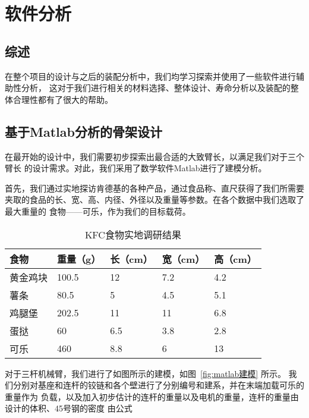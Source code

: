 

\chapter{软件分析}

\section{综述}

  {\songti 在整个项目的设计与之后的装配分析中，我们均学习探索并使用了一些软件进行辅助性分析，
 这对于我们进行相关的材料选择、整体设计、寿命分析以及装配的整体合理性都有了很大的帮助。}

\section{基于Matlab分析的骨架设计}

  {\songti 在最开始的设计中，我们需要初步探索出最合适的大致臂长，以满足我们对于三个臂长
  的设计需求。对此，我们采用了数学软件Matlab进行了建模分析。}

  {\songti 首先，我们通过实地探访肯德基的各种产品，通过食品称、直尺获得了我们所需要
  夹取的食品的长、宽、高、内径、外径以及重量等参数。在各个数据中我们选取了最大重量的
  食物——可乐，作为我们的目标载荷。}

  {\begin{table}
    \centering
    \caption{KFC食物实地调研结果}
    \begin{tabular}{|l|l|l|l|l|}
    \hline
    
    食物 & 重量（g） & 长（cm） & 宽（cm） & 高（cm） \\ \hline
    黄金鸡块 & 100.5 & 12 & 7.2 & 4.2 \\ \hline
    薯条 & 80.5 & 5 & 4.5 & 5.1 \\ \hline
    鸡腿堡 & 202.5 & 11 & 11 & 6.8 \\ \hline
    蛋挞 & 60 & 6.5 & 3.8 & 2.8 \\ \hline
    可乐 & 460 & 8.8 & 6 & 13 \\ \hline
    
  \end{tabular}
  \end{table} }

  {\songti 对于三杆机械臂，我们进行了如图所示的建模，如图~\ref{fig:matlab建模} 所示。
  我们分别对基座和连杆的铰链和各个壁进行了分别编号和建系，并在末端加载可乐的重量作为
  负载，以及加入初步估计的连杆的重量以及电机的重量，连杆的重量由设计的体积、45号钢的密度
  由公式}

